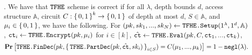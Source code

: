 \begin{definition}.
	We have that ${\texttt{TFHE}}$ scheme is correct if
	for all $\lambda$, depth bounds $d$, access structure $\mathbb{A}$, circuit $C : \set{0, 1}^k \rightarrow \set{0, 1}$
	of depth at most $d$, $S \in \mathbb{A}$, and $\mu_i \in \set{0, 1}$, we have the following.
	For $(pk, sk_1, ..., sk_N) \gets \texttt{TFHE.Setup}(1^\lambda, 1^d, \mathbb{A})$,
	$\texttt{ct}_i \gets \texttt{TFHE.Encrypt}(pk, \mu_i)$ for $i \in [k]$, $\hat{\texttt{ct}} \gets \texttt{TFHE.Eval}(pk, C, \texttt{ct}_1, ..., \texttt{ct}_k)$,
	\begin{equation*}
		\operatorname*{\mathbf{Pr}}\left[\texttt{TFHE.FinDec}(pk,
			\set{\texttt{TFHE.PartDec}(pk, \hat{\texttt{ct}}, sk_i)}_{i \in S}) = C(\mu_1, ..., \mu_k)\right] = 1 - \texttt{negl}(\lambda).
	\end{equation*}
\end{definition}


